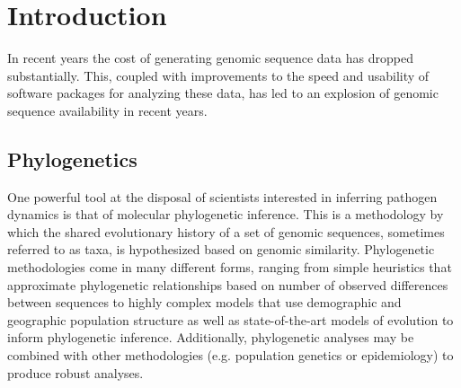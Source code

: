 \chapter{Introduction}\label{ch:introduction}



In recent years the cost of generating genomic sequence data has dropped substantially.
This, coupled with improvements to the speed and usability of software packages for analyzing these data, has led to an explosion of genomic sequence availability in recent years.


\section{Phylogenetics}

One powerful tool at the disposal of scientists interested in inferring pathogen dynamics is that of molecular phylogenetic inference.
This is a methodology by which the shared evolutionary history of a set of genomic sequences, sometimes referred to as taxa, is hypothesized based on genomic similarity.
Phylogenetic methodologies come in many different forms, ranging from simple heuristics that approximate phylogenetic relationships based on number of observed differences between sequences\cite{felsenstein2003inferring} to highly complex models that use demographic and geographic population structure as well as state-of-the-art models of evolution to inform phylogenetic inference\cite{dudas2018mers}.
Additionally, phylogenetic analyses may be combined with other methodologies (e.g. population genetics\cite{felsenstein2003inferring} or epidemiology\cite{Black2020}) to produce robust analyses.


